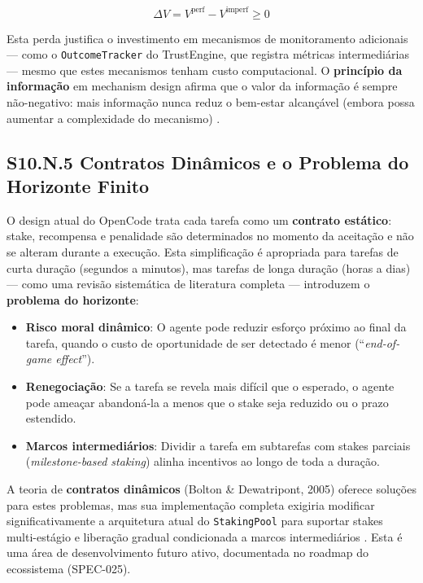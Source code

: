 \begin{equation}\label{eq:info_value}
\Delta V = V^{\text{perf}} - V^{\text{imperf}} \geq 0
\end{equation}

Esta perda justifica o investimento em mecanismos de monitoramento adicionais --- como o \texttt{OutcomeTracker} do TrustEngine, que registra métricas intermediárias --- mesmo que estes mecanismos tenham custo computacional. O \textbf{princípio da informação} em mechanism design afirma que o valor da informação é sempre não-negativo: mais informação nunca reduz o bem-estar alcançável (embora possa aumentar a complexidade do mecanismo) \cite{bergemann2019mechanism}.

\subsection*{S10.N.5 Contratos Dinâmicos e o Problema do Horizonte Finito}

O design atual do OpenCode trata cada tarefa como um \textbf{contrato estático}: stake, recompensa e penalidade são determinados no momento da aceitação e não se alteram durante a execução. Esta simplificação é apropriada para tarefas de curta duração (segundos a minutos), mas tarefas de longa duração (horas a dias) --- como uma revisão sistemática de literatura completa --- introduzem o \textbf{problema do horizonte}:

\begin{itemize}
    \item \textbf{Risco moral dinâmico}: O agente pode reduzir esforço próximo ao final da tarefa, quando o custo de oportunidade de ser detectado é menor (``\textit{end-of-game effect}'').
    \item \textbf{Renegociação}: Se a tarefa se revela mais difícil que o esperado, o agente pode ameaçar abandoná-la a menos que o stake seja reduzido ou o prazo estendido.
    \item \textbf{Marcos intermediários}: Dividir a tarefa em subtarefas com stakes parciais (\textit{milestone-based staking}) alinha incentivos ao longo de toda a duração.
\end{itemize}

A teoria de \textbf{contratos dinâmicos} (Bolton \& Dewatripont, 2005) oferece soluções para estes problemas, mas sua implementação completa exigiria modificar significativamente a arquitetura atual do \texttt{StakingPool} para suportar stakes multi-estágio e liberação gradual condicionada a marcos intermediários \cite{bolton2005contract}. Esta é uma área de desenvolvimento futuro ativo, documentada no roadmap do ecossistema (SPEC-025).

